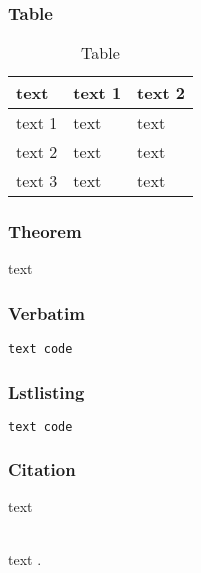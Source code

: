 \documentclass{beamer}
\begin{document}
\begin{frame}
\frametitle{Table}
\begin{table}
\begin{tabular}{l l l}
\toprule
\textbf{text} & \textbf{text 1} & \textbf{text 2}\\
\midrule
text 1 & text & text \\
text 2 & text & text \\
text 3 & text & text \\
\bottomrule
\end{tabular}
\caption{Table}
\end{table}
\end{frame}


\begin{frame}
\frametitle{Theorem}
\begin{theorem}
text
\end{theorem}
\end{frame}


\begin{frame}[fragile] %
\frametitle{Verbatim}
\begin{example}[Code]
\begin{verbatim}
text code
\end{verbatim}
\end{example}
\end{frame}


\begin{frame}[fragile]
\frametitle{Lstlisting}
\begin{example}[Code]
\begin{lstlisting}[language=bash, frame=single]
text code
\end{lstlisting}
\end{example}
\end{frame}


\begin{frame}[fragile] %
\frametitle{Citation}
text\\~

text \cite{p1}.
\end{frame}
\end{document}

